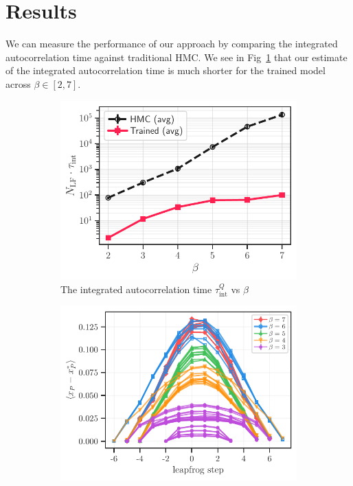 \documentclass[a4paper,11pt]{article}
\begin{document}
\section{\label{sec:results}Results}
We can measure the performance of our approach by comparing the integrated
autocorrelation time against traditional HMC.
%
We see in Fig~\ref{fig:autocorr} that our estimate of the integrated
autocorrelation time is much shorter for the trained model across \(\beta \in
[2, 7]\).
%
\begin{figure}[t]
    \centering
    \begin{subfigure}[t]{0.47\textwidth}
        \includegraphics[width=\textwidth]{assets/autocorr_vs_beta.pdf}
        \caption{\label{fig:autocorr} The integrated autocorrelation
        time \(\tau_{\mathrm{int}}^{Q}\) vs \(\beta\)}
    \end{subfigure}
    \hfill
    \begin{subfigure}[t]{0.49\textwidth}
        \includegraphics[width=\textwidth]{assets/plaqsf_leapfrog.pdf}

\end{subfigure}
\end{figure}
\end{document}
